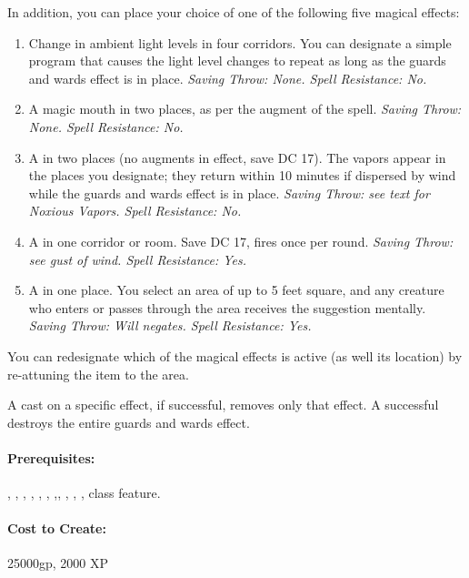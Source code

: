 In addition, you can place your choice of one of the following five magical effects:
\begin{enumerate}
\item Change in ambient light levels in four corridors. 
You can designate a simple program that causes the light level changes to repeat as long as the guards and wards effect is in place. 
\emph{Saving Throw: None. Spell Resistance: No.}
\item A magic mouth in two places, as per the augment of the  spell. 
\emph{Saving Throw: None. Spell Resistance: No.}
\item A  in two places (no augments in effect, save DC 17). 
The vapors appear in the places you designate; they return within 10 minutes if dispersed by wind while the guards and wards effect is in place. 
\emph{Saving Throw: see text for Noxious Vapors. Spell Resistance: No.}
\item A  in one corridor or room. Save DC 17, fires once per round.
\emph{Saving Throw: see gust of wind. Spell Resistance: Yes.}
\item A  in one place. 
You select an area of up to 5 feet square, and any creature who enters or passes through the area receives the suggestion mentally. 
\emph{Saving Throw: Will negates. Spell Resistance: Yes.}
\end{enumerate}
You can redesignate which of the magical effects is active (as well its location) by re-attuning the item to the area.

A  cast on a specific effect, if successful, removes only that effect. A successful  destroys the entire guards and wards effect. 

\paragraph{Prerequisites:} , , , , , , ,, , , ,  class feature.

\paragraph{Cost to Create:} 25000gp, 2000 XP
